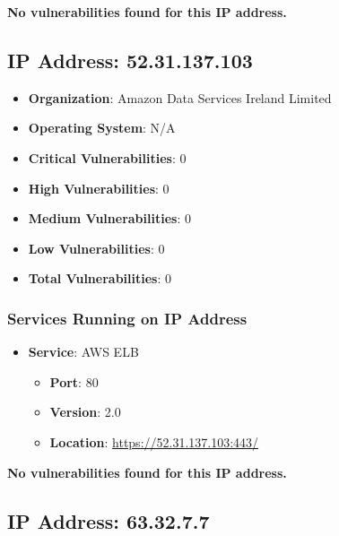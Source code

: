 \documentclass{article}
\begin{document}
\textbf{No vulnerabilities found for this IP address.}




\clearpage



\subsection*{IP Address: 52.31.137.103}

\begin{itemize}
    \item \textbf{Organization}: Amazon Data Services Ireland Limited
    \item \textbf{Operating System}:  N/A 
    \item \textbf{Critical Vulnerabilities}: 0
    \item \textbf{High Vulnerabilities}: 0
    \item \textbf{Medium Vulnerabilities}: 0
    \item \textbf{Low Vulnerabilities}: 0
    \item \textbf{Total Vulnerabilities}: 0
\end{itemize}

\subsubsection*{Services Running on IP Address}

\begin{itemize}
    
        \item \textbf{Service}: AWS ELB
        \begin{itemize}
            \item \textbf{Port}: 80
            \item \textbf{Version}:  2.0 
            \item \textbf{Location}: \href{ https://52.31.137.103:443/ }{ https://52.31.137.103:443/ }
        \end{itemize}
    
\end{itemize}


\textbf{No vulnerabilities found for this IP address.}




\clearpage



\subsection*{IP Address: 63.32.7.7}
\end{document}
